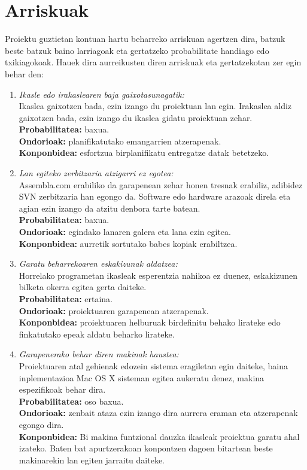 \section{Arriskuak}
Proiektu guztietan kontuan hartu beharreko arriskuan agertzen dira, batzuk beste batzuk baino larriagoak eta gertatzeko probabilitate handiago edo txikiagokoak. Hauek dira aurreikusten diren arriskuak eta gertatzekotan zer egin behar den:
\begin{enumerate}

\item \textit{Ikasle edo irakaslearen baja gaixotasunagatik:}\\
Ikaslea gaixotzen bada, ezin izango du proiektuan lan egin. Irakaslea aldiz gaixotzen bada, ezin izango du ikaslea gidatu proiektuan zehar.\\
\textbf{Probabilitatea:} baxua.\\
\textbf{Ondorioak:} planifikatutako emangarrien atzerapenak.\\
\textbf{Konponbidea:} esfortzua birplanifikatu entregatze datak betetzeko.

\item \textit{Lan egiteko zerbitzaria atzigarri ez egotea:}\\
Assembla.com erabiliko da garapenean zehar honen tresnak erabiliz, adibidez SVN zerbitzaria han egongo da. Software edo hardware arazoak direla eta agian ezin izango da atzitu denbora tarte batean.\\
\textbf{Probabilitatea:} baxua.\\
\textbf{Ondorioak:} egindako lanaren galera eta lana ezin egitea.\\
\textbf{Konponbidea:} aurretik sortutako babes kopiak erabiltzea.

\item \textit{Garatu beharrekoaren eskakizunak aldatzea:}\\
Horrelako programetan ikasleak esperentzia nahikoa ez duenez, eskakizunen bilketa okerra egitea gerta daiteke.\\
\textbf{Probabilitatea:} ertaina.\\
\textbf{Ondorioak:} proiektuaren garapenean atzerapenak.\\
\textbf{Konponbidea:} proiektuaren helburuak birdefinitu behako lirateke edo finkatutako epeak aldatu beharko lirateke.

\item \textit{Garapenerako behar diren makinak haustea:}\\
Proiektuaren atal gehienak edozein sistema eragiletan egin daiteke, baina inplementazioa Mac OS X sisteman egitea aukeratu denez, makina espezifikoak behar dira.\\
\textbf{Probabilitatea:} oso baxua.\\
\textbf{Ondorioak:} zenbait ataza ezin izango dira aurrera eraman eta atzerapenak egongo dira.\\
\textbf{Konponbidea:} Bi makina funtzional dauzka ikasleak proiektua garatu ahal izateko. Baten bat apurtzerakoan konpontzen dagoen bitartean beste makinarekin lan egiten jarraitu daiteke.
\end{enumerate}

